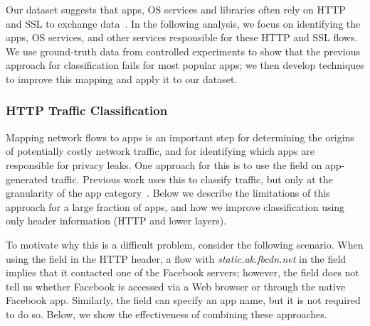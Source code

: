 Our \mobWild dataset suggests that apps, OS services and libraries often rely on HTTP and SSL to exchange data~\cite{maier:mobtraffic,falaki:mobileusage,xu:appusage}.
In the following analysis, we focus on identifying the apps, OS services, and other services responsible for these HTTP and SSL flows. 
We use ground-truth data from controlled experiments to show that the previous approach for classification fails 
for most popular apps; we then develop techniques to improve this mapping and apply it to our \mobWild dataset. 

\subsubsection{HTTP Traffic Classification}

Mapping network flows to apps is an important step for determining the origins of potentially costly 
network traffic, and for identifying which apps are responsible for privacy leaks. One approach for this is to use the \useragent field on app-generated traffic.
Previous work uses this to classify traffic, but only at the granularity of the app category~\cite{erman2011http,xu:appusage,maier:mobtraffic}. 
Below we describe the limitations of this approach for a large fraction of apps, and how we improve classification using only header information (\ie HTTP and lower layers). 

To motivate why this is a difficult problem, consider the following scenario. When using the \httphost field in the HTTP header, a flow with \emph{static.ak.fbcdn.net} in the \httphost field implies that it contacted one of the Facebook servers; however, the \httphost field does not tell us whether Facebook is accessed via a Web browser or through the native Facebook app. Similarly, the \useragent field can specify an app name, but it is not required to do so. Below, we show the effectiveness of combining these approaches. 


